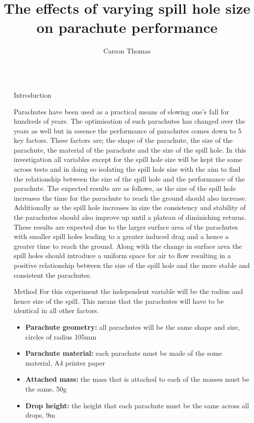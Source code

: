 \documentclass[final]{beamer}
\title{The effects of varying spill hole size on parachute performance}
\author{Carson Thomas}
\institute[shortinst]{Albert Park College}
\newlength{\sepwidth}
\newlength{\colwidth}
\newcommand{\separatorcolumn}{\begin{column}{\sepwidth}\end{column}}
\begin{document}
\begin{frame}[t]
\begin{columns}[t]
\separatorcolumn

\begin{column}{\colwidth}

  \begin{block}{Introduction}

    Parachutes have been used as a practical means of slowing one's fall for hundreds of years. The optimisation of such parachutes has changed over the years as well but in essence the performance of parachutes comes down to 5 key factors. These factors are; the shape of the parachute, the size of the parachute, the material of the parachute and the size of the spill hole. In this investigation all variables except for the spill hole size will be kept the same across tests and in doing so isolating the spill hole size with the aim to find the relationship between the size of the spill hole and the performance of the parachute. The expected results are as follows, as the size of the spill hole increases the time for the parachute to reach the ground should also increase. Additionally as the spill hole increases in size the consistency and stability of the parachutes should also improve up until a plateau of diminishing returns. These results are expected due to the larger surface area of the parachutes with smaller spill holes leading to a greater induced drag and a hence a greater time to reach the ground. Along with the change in surface area the spill holes should introduce a uniform space for air to flow resulting in a positive relationship between the size of the spill hole and the more stable and consistent the parachutes.

  \end{block}

  \begin{block}{Method}
For this experiment the independent variable will be the radius and hence size of the spill. This means that the parachutes will have to be identical in all other factors. 

    \begin{itemize}
      \item \textbf{Parachute geometry:} all parachutes will be the same shape and size, circles of radius 105mm
      \item \textbf{Parachute material:} each parachute must be made of the some material, A4 printer paper
      \item \textbf{Attached mass:} the mass that is attached to each of the masses must be the same, 50g
       \item \textbf{Drop height:} the height that each parachute must be the same across all drops, 9m 
       

\end{itemize}
\end{block}
\end{column}
\end{columns}
\end{frame}
\end{document}
